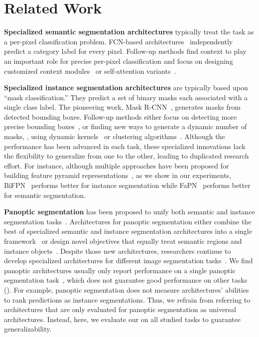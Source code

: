 \section{Related Work}

\noindent\textbf{Specialized semantic segmentation architectures} typically treat the task as a per-pixel classification problem. FCN-based architectures~\cite{long2015fully} independently predict a category label for every pixel. Follow-up methods find context to play an important role for  precise per-pixel classification and focus on designing customized context modules~\cite{deeplabV2,deeplabV3,zhao2017pspnet} or self-attention variants~\cite{wang2018non,fu2019dual,yuan2018ocnet,huang2019ccnet,zheng2021rethinking,strudel2021segmenter}.

\noindent\textbf{Specialized instance segmentation architectures} are typically based upon ``mask classification.'' They predict a set of binary masks each associated with a single class label. The pioneering work, Mask R-CNN~\cite{he2017mask}, generates masks from detected bounding boxes. Follow-up methods either focus on detecting more precise bounding boxes~\cite{cai2018cascade,chen2019hybrid}, or finding new ways to generate a dynamic number of masks, \eg, using dynamic kernels~\cite{tian2020conditional,wang2020solov2,yolact-plus-arxiv2019} or clustering algorithms~\cite{kirillov2016instancecut,cheng2020panoptic}. Although the performance has been advanced in each task, these specialized innovations lack the flexibility to generalize from one to the other, leading to duplicated research effort. For instance, although multiple approaches have been proposed for building feature pyramid representations~\cite{lin2016feature}, as we show in our experiments,
BiFPN~\cite{tan2020efficientdet} performs better for instance segmentation while FaPN~\cite{fapn} performs better for semantic segmentation.


\noindent\textbf{Panoptic segmentation} has been proposed to unify both semantic and instance segmentation tasks~\cite{kirillov2017panoptic}. Architectures for panoptic segmentation either combine the best of specialized semantic and instance segmentation architectures into a single framework~\cite{xiong19upsnet,kirillov2019panopticfpn,cheng2020panoptic,li2021fully} or design novel objectives that equally treat semantic regions and instance objects~\cite{detr,wang2021max}. Despite those new architectures, researchers continue to develop specialized architectures for different image segmentation tasks~\cite{strudel2021segmenter,QueryInst}.
We find panoptic architectures usually only report performance on a single panoptic segmentation task~\cite{wang2021max}, which does not guarantee good performance on other tasks (). For example, panoptic segmentation does not measure architectures' abilities to rank predictions as instance segmentations. Thus, we refrain from referring to architectures that are only evaluated for panoptic segmentation as universal architectures. Instead, here, we evaluate our \modelname on all studied tasks to guarantee generalizability.

